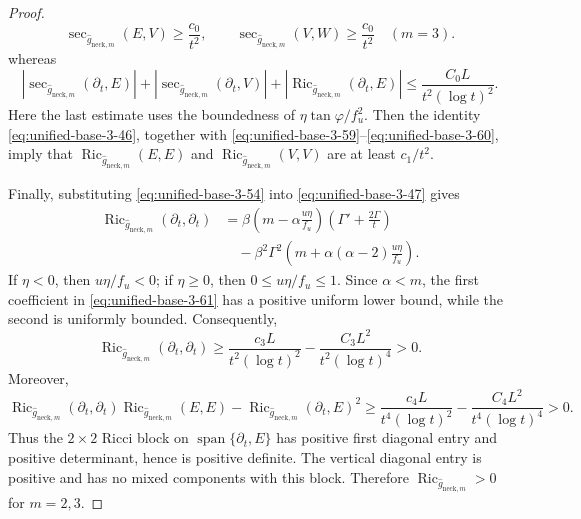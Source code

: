 \documentclass[11pt,reqno]{amsart}
\theoremstyle{definition}
\numberwithin{equation}{section}
\DeclareMathOperator{\Ric}{Ric}
\DeclareMathOperator{\vspan}{span}
\begin{document}
\begin{proof}
\begin{equation}
\sec_{\widehat g_{\mathrm{neck},m}}(E,V)\ge\frac{c_0}{t^2},\qquad
 \sec_{\widehat g_{\mathrm{neck},m}}(V,W)\ge\frac{c_0}{t^2}\quad(m=3).      \label{eq:unified-base-3-59}
\end{equation}
whereas
\begin{equation}
|\sec_{\widehat g_{\mathrm{neck},m}}(\partial_t,E)|
 +|\sec_{\widehat g_{\mathrm{neck},m}}(\partial_t,V)|
 +|\Ric_{\widehat g_{\mathrm{neck},m}}(\partial_t,E)|
 \le\frac{C_0L}{t^2(\log t)^2}.                                 \label{eq:unified-base-3-60}
\end{equation}
Here the last estimate uses the boundedness of
$\eta\tan\varphi/f_u^2$.  Then the identity 
\eqref{eq:unified-base-3-46}, together with
\eqref{eq:unified-base-3-59}--\eqref{eq:unified-base-3-60}, imply that
$\Ric_{\widehat g_{\mathrm{neck},m}}(E,E)$ and
$\Ric_{\widehat g_{\mathrm{neck},m}}(V,V)$ are at least
$c_1/t^2$.

Finally, substituting \eqref{eq:unified-base-3-54} into \eqref{eq:unified-base-3-47} gives
\begin{equation}
\begin{aligned}
 \Ric_{\widehat g_{\mathrm{neck},m}}(\partial_t,\partial_t)
 &=\beta\left(m-\alpha\frac{u\eta}{f_u}\right)
          \left(\Gamma'+\frac{2\Gamma}{t}\right)\\
 &\quad-\beta^2\Gamma^2
        \left(m+\alpha(\alpha-2)\frac{u\eta}{f_u}\right).
\end{aligned}                                                     \label{eq:unified-base-3-61}
\end{equation}
If $\eta<0$, then $u\eta/f_u<0$; if $\eta\ge0$, then
$0\le u\eta/f_u\le1$.  Since $\alpha<m$, the first coefficient in
\eqref{eq:unified-base-3-61} has a positive uniform lower bound, while the second
is uniformly bounded.  Consequently,
\begin{equation}
\Ric_{\widehat g_{\mathrm{neck},m}}(\partial_t,\partial_t)
 \ge\frac{c_3L}{t^2(\log t)^2}
     -\frac{C_3L^2}{t^2(\log t)^4}>0.                             \label{eq:unified-base-3-62}
\end{equation}
Moreover,
\begin{equation}
\Ric_{\widehat g_{\mathrm{neck},m}}(\partial_t,\partial_t)
   \Ric_{\widehat g_{\mathrm{neck},m}}(E,E)
 -\Ric_{\widehat g_{\mathrm{neck},m}}(\partial_t,E)^2
 \ge\frac{c_4L}{t^4(\log t)^2}
     -\frac{C_4L^2}{t^4(\log t)^4}>0.                             \label{eq:unified-base-3-63}
\end{equation}
Thus the $2\times2$ Ricci block on
$\vspan\{\partial_t,E\}$ has positive first diagonal
entry and positive determinant, hence is positive definite.  The
vertical diagonal entry is positive and has no mixed components with
this block.  Therefore
$\Ric_{\widehat g_{\mathrm{neck},m}}>0$ for $m=2,3$.
\end{proof}
\end{document}
